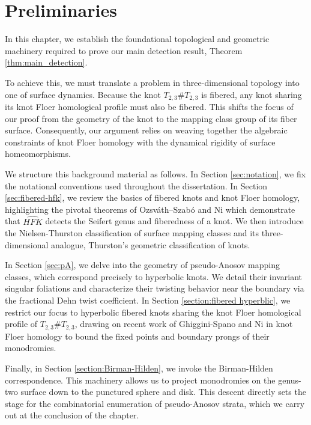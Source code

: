 \chapter{Preliminaries}\label{chap:preliminaries} 

In this chapter, we establish the foundational topological and geometric machinery required to prove our main detection result, Theorem \ref{thm:main_detection}.

To achieve this, we must translate a problem in three-dimensional topology into one of surface dynamics. Because the knot $T_{2,3} \# T_{2,3}$ is fibered, any knot sharing its knot Floer homological profile must also be fibered. This shifts the focus of our proof from the geometry of the knot to the mapping class group of its fiber surface. Consequently, our argument relies on weaving together the algebraic constraints of knot Floer homology with the dynamical rigidity of surface homeomorphisms.

We structure this background material as follows. In Section \ref{sec:notation}, we fix the notational conventions used throughout the dissertation. In Section \ref{sec:fibered-hfk}, we review the basics of fibered knots and knot Floer homology, highlighting the pivotal theorems of Ozsv\'{a}th--Szab\'{o} and Ni which demonstrate that $\widehat{HFK}$ detects the Seifert genus and fiberedness of a knot. We then introduce the Nielsen-Thurston classification of surface mapping classes and its three-dimensional analogue, Thurston's geometric classification of knots.

In Section \ref{sec:pA}, we delve into the geometry of pseudo-Anosov mapping classes, which correspond precisely to hyperbolic knots. We detail their invariant singular foliations and characterize their twisting behavior near the boundary via the fractional Dehn twist coefficient. In Section \ref{section:fibered hyperblic}, we restrict our focus to hyperbolic fibered knots sharing the knot Floer homological profile of $T_{2,3} \# T_{2,3}$, drawing on recent work of Ghiggini-Spano and Ni in knot Floer homology to bound the fixed points and boundary prongs of their monodromies.

Finally, in Section \ref{section:Birman-Hilden}, we invoke the Birman-Hilden correspondence. This machinery allows us to project monodromies on the genus-two surface down to the punctured sphere and disk. This descent directly sets the stage for the combinatorial enumeration of pseudo-Anosov strata, which we carry out at the conclusion of the chapter.

